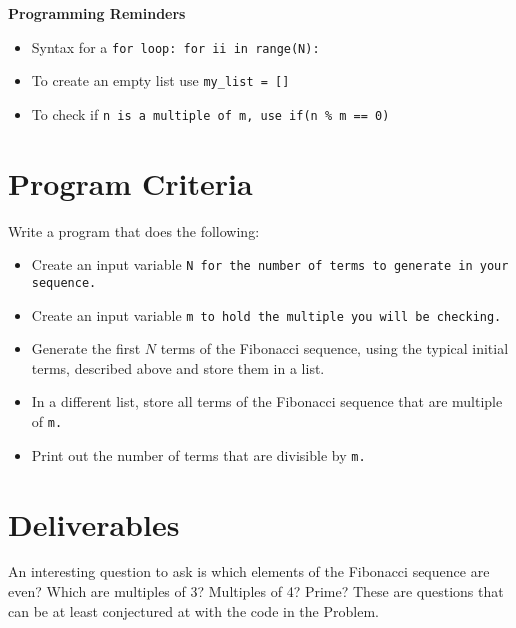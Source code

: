 \documentclass{article}
\def\prog#1{
\vspace{.1in}\begin{mdframed} \begin{center} \textbf{Programming Reminders} \end{center}#1 \end{mdframed} }
\begin{document}
	
	
	
	
	
	
	
	
	\prog{
		\begin{itemize}
			\item Syntax for a \tt{for} loop: \tt{for ii in range(N):}
			\item To create an empty list use \tt{my\_list = []}
			\item To check if \tt{n} is a multiple of \tt{m}, use \tt{if(n \% m == 0)}
		\end{itemize}
		}




\section*{Program Criteria}
	Write a program that does the following:
	\begin{itemize}
		\item Create an input variable \tt{N} for the number of terms to generate in your sequence.
		\item Create an input variable \tt{m} to hold the multiple you will be checking.
		\item Generate the first $N$ terms of the Fibonacci sequence, using the typical initial terms, described above and store them in a list.
		\item In a different list, store all terms of the Fibonacci sequence that are multiple of \tt{m}.
		\item Print out the number of terms that are divisible by \tt{m}.
	\end{itemize}







\section*{Deliverables}
	An interesting question to ask is which elements of the Fibonacci sequence are even?  Which are multiples of 3?  Multiples of 4?  Prime?  These are questions that can be at least conjectured at with the code in the Problem.
	
\end{document}

